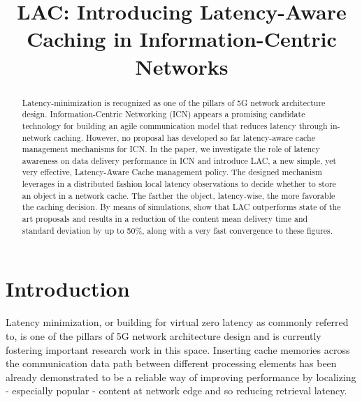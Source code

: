\documentclass[conference]{IEEEtran}
\begin{document}
\title{LAC: Introducing Latency-Aware Caching in Information-Centric Networks}

\author{
}


\maketitle

\begin{abstract} 
Latency-minimization is recognized as one of the pillars of
5G network architecture design. Information-Centric 
Networking (ICN) appears a promising candidate technology for
building an agile communication model that reduces latency
through in-network caching. However, no proposal has
developed so far latency-aware cache management mechanisms 
for ICN.
In the paper, we investigate the role of latency awareness on
data delivery performance in ICN and introduce LAC, a new
simple, yet very effective, Latency-Aware Cache management
policy. The designed mechanism leverages in a distributed
fashion local latency observations to decide whether to store
an object in a network cache. The farther the object,
latency-wise, the more favorable the caching decision.
By means of simulations, show that LAC outperforms state of 
the art proposals and  results in a reduction of the content 
mean delivery time and standard deviation by up to 50\%, 
along with a very fast convergence to these figures.
\end{abstract}

\section{Introduction}
Latency minimization, or building for virtual zero latency as 
commonly referred to, is one of the pillars of 5G network 
architecture design and is currently fostering important 
research work in this space.
Inserting cache memories across the communication data path 
between different processing elements has been already 
demonstrated to be a reliable way of improving performance 
by localizing - especially popular - content at network edge 
and so reducing retrieval latency.
\end{document}
